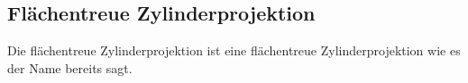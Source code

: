 \subsection{Flächentreue Zylinderprojektion}
\label{sec:equareazyl}
Die flächentreue Zylinderprojektion ist eine flächentreue Zylinderprojektion wie es der Name bereits sagt. 